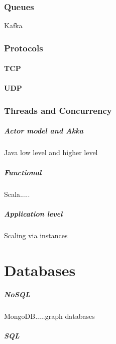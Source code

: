 \documentclass[a4paper, 11pt]{book}
\begin{document}
    \subsection{Queues}
    Kafka

    \subsection{Protocols}

    \subsubsection{TCP}

    \subsubsection{UDP}

    \subsection{Threads and Concurrency}

    \paragraph{Actor model and Akka}
    Java low level and higher level

    \paragraph{Functional}
    Scala.....

    \paragraph{Application level}
    Scaling via instances


    \chapter{Databases}

    \paragraph{NoSQL}
    MongoDB.....graph databases

    \paragraph{SQL}
\end{document}
